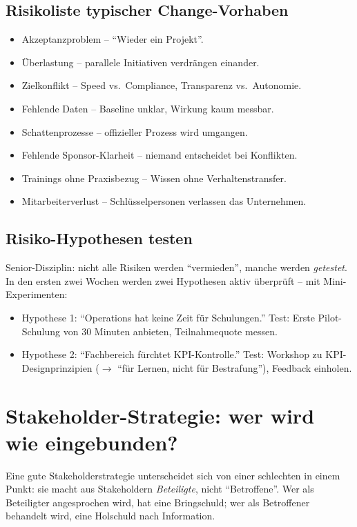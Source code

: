 \documentclass[11pt,a4paper,oneside]{article}
\begin{document}
\subsection{Risikoliste typischer Change-Vorhaben}

\begin{itemize}
  \item Akzeptanzproblem -- ``Wieder ein Projekt''.
  \item Überlastung -- parallele Initiativen verdrängen einander.
  \item Zielkonflikt -- Speed vs.\ Compliance, Transparenz vs.\ Autonomie.
  \item Fehlende Daten -- Baseline unklar, Wirkung kaum messbar.
  \item Schattenprozesse -- offizieller Prozess wird umgangen.
  \item Fehlende Sponsor-Klarheit -- niemand entscheidet bei Konflikten.
  \item Trainings ohne Praxisbezug -- Wissen ohne Verhaltenstransfer.
  \item Mitarbeiterverlust -- Schlüsselpersonen verlassen das Unternehmen.
\end{itemize}

\subsection{Risiko-Hypothesen testen}

Senior-Disziplin: nicht alle Risiken werden ``vermieden'', manche werden \emph{getestet}. In den ersten zwei Wochen werden zwei Hypothesen aktiv überprüft -- mit Mini-Experimenten:

\begin{itemize}
  \item Hypothese 1: ``Operations hat keine Zeit für Schulungen.'' Test: Erste Pilot-Schulung von 30 Minuten anbieten, Teilnahmequote messen.
  \item Hypothese 2: ``Fachbereich fürchtet KPI-Kontrolle.'' Test: Workshop zu KPI-Designprinzipien ($\to$ ``für Lernen, nicht für Bestrafung''), Feedback einholen.
\end{itemize}

\section{Stakeholder-Strategie: wer wird wie eingebunden?}

Eine gute Stakeholderstrategie unterscheidet sich von einer schlechten in einem Punkt: sie macht aus Stakeholdern \emph{Beteiligte}, nicht ``Betroffene''. Wer als Beteiligter angesprochen wird, hat eine Bringschuld; wer als Betroffener behandelt wird, eine Holschuld nach Information.
\end{document}
